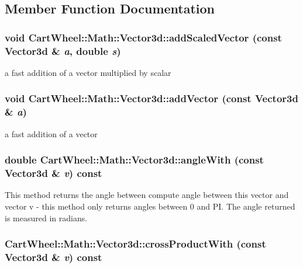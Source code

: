 \subsection{Member Function Documentation}
\hypertarget{classCartWheel_1_1Math_1_1Vector3d_a8ef8f6c9b8a37b326230866271036129}{
\subsubsection[{addScaledVector}]{\setlength{\rightskip}{0pt plus 5cm}void CartWheel::Math::Vector3d::addScaledVector (const {\bf Vector3d} \& {\em a}, \/  double {\em s})}}
\label{classCartWheel_1_1Math_1_1Vector3d_a8ef8f6c9b8a37b326230866271036129}
a fast addition of a vector multiplied by scalar \hypertarget{classCartWheel_1_1Math_1_1Vector3d_a73161833fe21aebbdaebaaa8efd95603}{
\subsubsection[{addVector}]{\setlength{\rightskip}{0pt plus 5cm}void CartWheel::Math::Vector3d::addVector (const {\bf Vector3d} \& {\em a})}}
\label{classCartWheel_1_1Math_1_1Vector3d_a73161833fe21aebbdaebaaa8efd95603}
a fast addition of a vector \hypertarget{classCartWheel_1_1Math_1_1Vector3d_a5a81a069ee08897a24a6dc60c12d463d}{
\subsubsection[{angleWith}]{\setlength{\rightskip}{0pt plus 5cm}double CartWheel::Math::Vector3d::angleWith (const {\bf Vector3d} \& {\em v}) const}}
\label{classCartWheel_1_1Math_1_1Vector3d_a5a81a069ee08897a24a6dc60c12d463d}
This method returns the angle between compute angle between this vector and vector v -\/ this method only returns angles between 0 and PI. The angle returned is measured in radians. \hypertarget{classCartWheel_1_1Math_1_1Vector3d_a00283de03507da30bf2a9e8ce84b22bd}{
\subsubsection[{crossProductWith}]{ CartWheel::Math::Vector3d::crossProductWith (const {\bf Vector3d} \& {\em v}) const}}
